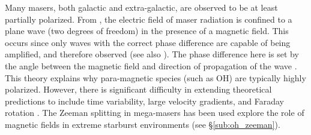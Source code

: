 Many masers, both galactic and extra-galactic, are observed to be at least partially polarized. From \citet{Elitzur_1992}, the electric field of maser radiation is confined to a plane wave (two degrees of freedom) in the presence of a magnetic field. This occurs since only waves with the correct phase difference are capable of being amplified, and therefore observed (see also \citet{Goldreich_1973,Elitzur_1991}). The phase difference here is set by the angle between the magnetic field and direction of propagation of the wave \citep{Elitzur_1992}. This theory explains why para-magnetic species (such as OH) are typically highly polarized.  However, there is significant difficulty in extending theoretical predictions to include time variability, large velocity gradients, and Faraday rotation \citep{Elitzur_1992}.  The Zeeman splitting in mega-masers has been used explore the role of magnetic fields in extreme starburst environments (see \S\ref{sub:oh_zeeman}).

 